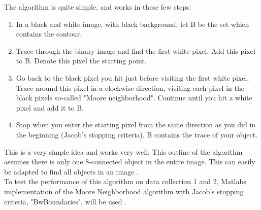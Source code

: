 The algorithm is quite simple, and works in these few steps:
\begin{enumerate}
    \item In a black and white image, with black background, let B be the set which contains the contour.  
    \item Trace through the binary image and find the first white pixel. Add this pixel to B. Denote this pixel the starting point.  
    \item Go back to the black pixel you hit just before visiting the first white pixel. Trace around this pixel in a clockwise direction, visiting each pixel in the black pixels so-called "Moore neighborhood". Continue until you hit a white pixel and add it to B. 
    \item Stop when you enter the starting pixel from the same direction as you did in the beginning (Jacob's stopping criteria). B contains the trace of your object.
\end{enumerate}
This is a very simple idea and works very well. This outline of the algorithm assumes there is only one 8-connected object in the entire image. This can easily be adapted to find all objects in an image \cite{gonzalez2018digitalChapter12.2} \cite{mooreneighbourhood}. \\

To test the performance of this algorithm on data collection 1 and 2, Matlabs implementation of the Moore Neighborhood algorithm with Jacob's stopping criteria, "BwBoundaries", will be used \cite{matlab_bwboundaries}.  \\

